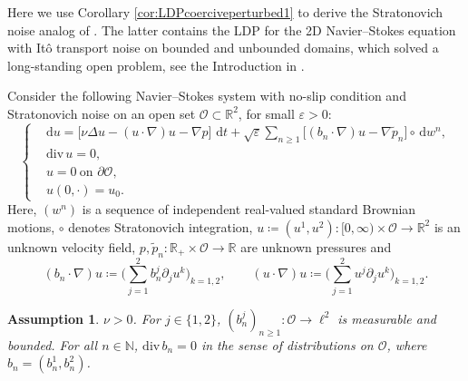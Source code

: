 \documentclass{amsart}
\newcommand{\dd}{\,\mathrm{d}}
\newcommand{\ddd}{\mathrm{d}}
\newcommand{\<}{\langle}
\newcommand{\?}{\rangle}
\newcommand{\col}{\colon}
\renewcommand{\O}{\mathcal{O}}
\renewcommand{\div}{\mathrm{div}}
\theoremstyle{plain}
\theoremstyle{remark}
\theoremstyle{plain}
\newtheorem{assumption}[theorem]{Assumption}
\numberwithin{equation}{section}
\def\N{{\mathbb N}}
\def\R{{\mathbb R}}
\newcommand{\eps}{\varepsilon}
\begin{document}
Here we use Corollary \ref{cor:LDPcoerciveperturbed1} to derive the Stratonovich noise analog of \cite[Th.\ 5.4]{TV24}. The latter contains the LDP for the 2D Navier--Stokes equation with It\^o transport noise on bounded and unbounded domains, which solved a long-standing open problem, see the Introduction in \cite{TV24}. 

Consider the following Navier--Stokes system with no-slip condition and Stratonovich noise on an open set $\O\subset \R^2$, for small $\eps>0$:
\begin{equation}
\label{eq:NS}
\left\{
\begin{aligned}
&\ddd {u} =\big[\nu \Delta {u} -({u}\cdot \nabla){u} -\nabla p  \big] \,\dd t +\sqrt{\varepsilon} \textstyle{\sum_{n\geq 1}}\big[(b_{n}\cdot\nabla) {u} -\nabla \widetilde{p}_n \big] \circ\dd w^n,
\\
&\div \,{u}=0,
\\& {u}=0 \ \text{on $\partial \O$},
\\& {u}(0,\cdot)=u_0.
\end{aligned}\right.
\end{equation}
Here, $(w^n)$ is a sequence of independent real-valued standard Brownian motions, $\circ$ denotes Stratonovich integration, $u\coloneqq(u^{1},u^{2})\colon[0,\infty)\times \O\to \R^2$ is an unknown velocity field, $p,\widetilde{p}_n\col \R_+\times \O\to \R$ are unknown pressures and 
\begin{equation*}
(b_{n}\cdot\nabla) u\coloneqq\Big(\textstyle{\sum_{j=1}^2} b_n^j \partial_j u^k\Big)_{k=1,2},
\qquad (u\cdot \nabla ) u\coloneqq\Big(\textstyle{\sum_{j=1}^2} u^j \partial_j u^k\Big)_{k=1,2}.
\end{equation*}

\begin{assumption}\label{ass:NS}
$\nu>0$. For  $j\in\{1,2\}$, $(b^j_{n})_{n\geq 1}\col \O\to \ell^2$ is measurable and bounded. For all $n\in\N$, $\div\, b_n=0$ in the sense of distributions on $\O$, where $b_n=(b_n^1,b_n^2)$.  
\end{assumption}
\end{document}
